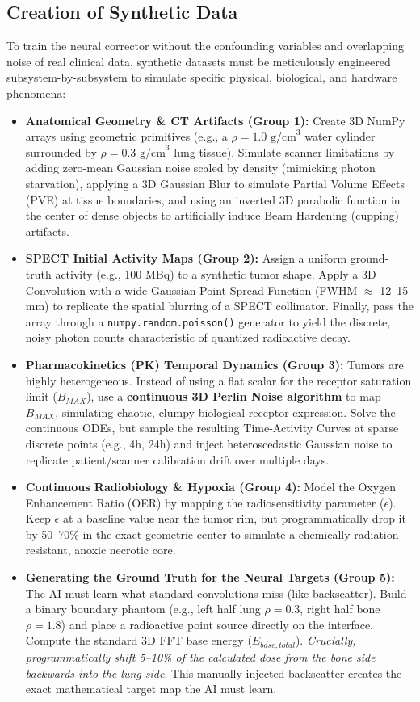\documentclass[11pt,a4paper]{article}
\begin{document}
\subsection{Creation of Synthetic Data}
To train the neural corrector without the confounding variables and overlapping noise of real clinical data, synthetic datasets must be meticulously engineered subsystem-by-subsystem to simulate specific physical, biological, and hardware phenomena:

\begin{itemize}
    \item \textbf{Anatomical Geometry \& CT Artifacts (Group 1):} Create 3D NumPy arrays using geometric primitives (e.g., a $\rho=1.0 \text{ g/cm}^3$ water cylinder surrounded by $\rho=0.3 \text{ g/cm}^3$ lung tissue). Simulate scanner limitations by adding zero-mean Gaussian noise scaled by density (mimicking photon starvation), applying a 3D Gaussian Blur to simulate Partial Volume Effects (PVE) at tissue boundaries, and using an inverted 3D parabolic function in the center of dense objects to artificially induce Beam Hardening (cupping) artifacts.
    \item \textbf{SPECT Initial Activity Maps (Group 2):} Assign a uniform ground-truth activity (e.g., 100 MBq) to a synthetic tumor shape. Apply a 3D Convolution with a wide Gaussian Point-Spread Function (FWHM $\approx$ 12--15 mm) to replicate the spatial blurring of a SPECT collimator. Finally, pass the array through a \texttt{numpy.random.poisson()} generator to yield the discrete, noisy photon counts characteristic of quantized radioactive decay.
    \item \textbf{Pharmacokinetics (PK) Temporal Dynamics (Group 3):} Tumors are highly heterogeneous. Instead of using a flat scalar for the receptor saturation limit ($B_{MAX}$), use a \textbf{continuous 3D Perlin Noise algorithm} to map $B_{MAX}$, simulating chaotic, clumpy biological receptor expression. Solve the continuous ODEs, but sample the resulting Time-Activity Curves at sparse discrete points (e.g., 4h, 24h) and inject heteroscedastic Gaussian noise to replicate patient/scanner calibration drift over multiple days.
    \item \textbf{Continuous Radiobiology \& Hypoxia (Group 4):} Model the Oxygen Enhancement Ratio (OER) by mapping the radiosensitivity parameter ($\epsilon$). Keep $\epsilon$ at a baseline value near the tumor rim, but programmatically drop it by 50--70\% in the exact geometric center to simulate a chemically radiation-resistant, anoxic necrotic core.
    \item \textbf{Generating the Ground Truth for the Neural Targets (Group 5):} The AI must learn what standard convolutions miss (like backscatter). Build a binary boundary phantom (e.g., left half lung $\rho=0.3$, right half bone $\rho=1.8$) and place a radioactive point source directly on the interface. Compute the standard 3D FFT base energy ($E_{base, total}$). \textit{Crucially, programmatically shift 5--10\% of the calculated dose from the bone side backwards into the lung side}. This manually injected backscatter creates the exact mathematical target map the AI must learn.
\end{itemize}
\end{document}
